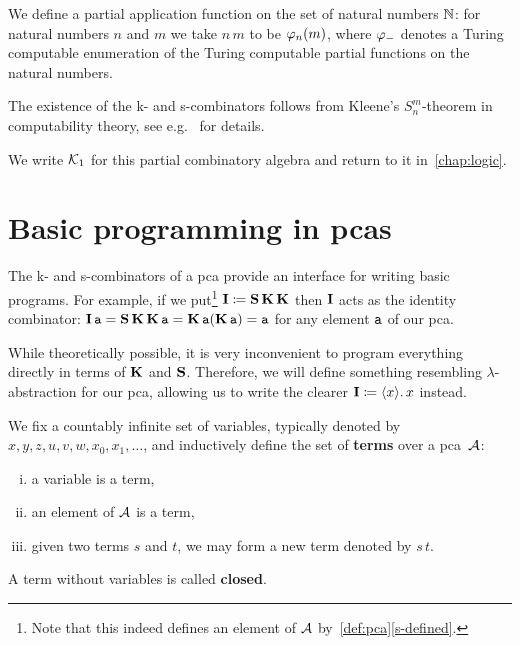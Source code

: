 \begin{example}\label{ex:Kleene-1}
  We define a partial application function on the set of natural numbers
  \(\Nat\): for natural numbers \(n\) and \(m\) we take \(n\,m\) to be
  \(\prenum{n}(m)\), where \(\prenum{-}\) denotes a Turing computable
  enumeration of the Turing computable partial functions on the natural numbers.

  The existence of the k- and s-combinators follows from Kleene's
  \(S^m_n\)-theorem in computability theory, see e.g.~\cite[Section~2.5.1 and
  Theorem~2.1.5]{Bauer2023} for details.

  We write \(\Kone\) for this partial combinatory algebra and return to
  it in~\cref{chap:logic}.
\end{example}

\section{Basic programming in pcas}\label{sec:basic-programming-in-pcas}

The k- and s-combinators of a pca provide an
interface for writing basic programs. For example, if we put\footnote{Note
  that this indeed defines an element of \(\AA\)
  by~\cref{def:pca}\ref{s-defined}.}
\(\icomb \coloneq \scomb\kcomb\kcomb\) then \(\icomb\) acts as the
identity combinator:
\(
  \icomb\pca{a} = \scomb\kcomb\kcomb\pca{a} = \kcomb\pca{a}(\kcomb\pca{a}) =
  {\pca{a}}
  \)
  for any element \(\pca{a}\) of our pca.

While theoretically possible, it is very inconvenient to program everything
directly in terms of \(\kcomb\) and \(\scomb\). Therefore, we will
define something resembling \(\lambda\)-abstraction for our pca, allowing us to
write the clearer \(\icomb \coloneq \lambdapca{x}{\var{x}}\) instead.

\begin{definition}[Terms]%
  We fix a countably infinite set of variables, typically denoted by
  \(x,y,z,u,v,w,x_0,x_1,\dots\), and inductively define the set of
  \textbf{terms} over a pca~\(\AA\):
  \begin{enumerate}[(i)]
  \item a variable is a term,
  \item an element of \(\AA\) is a term,
  \item given two terms \(s\) and \(t\), we may form a new term denoted by \(s\,t\).
  \end{enumerate}
  A term without variables is called \textbf{closed}.
\end{definition}

